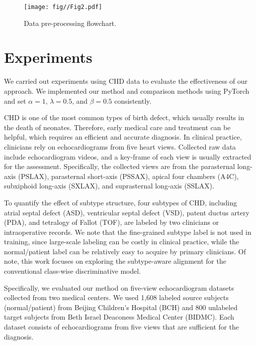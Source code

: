 

\begin{figure}[t]
\begin{center}
\texttt{[image: fig//Fig2.pdf]}
\end{center} 
\caption{Data pre-processing flowchart.}
\label{fig:2}
\end{figure}

\section{Experiments}

We carried out experiments using CHD data to evaluate the effectiveness of our approach. We implemented our method and comparison methods using PyTorch and set $\alpha=1$, $\lambda=0.5$, and $\beta=0.5$ consistently.

CHD is one of the most common types of birth defect, which usually results in the death of neonates. Therefore, early medical care and treatment can be helpful, which requires an efficient and accurate diagnosis. In clinical practice, clinicians rely on echocardiograms from five heart views. Collected raw data include echocardiogram videos, and a key-frame of each view is usually extracted for the assessment. Specifically, the collected views are from the parasternal long-axis (PSLAX), parasternal short-axis (PSSAX), apical four chambers (A4C), subxiphoid long-axis (SXLAX), and suprasternal long-axis (SSLAX). 

To quantify the effect of subtype structure, four subtypes of CHD, including atrial septal defect (ASD), ventricular septal defect (VSD), patent ductus artery (PDA), and tetralogy of Fallot (TOF), are labeled by two clinicians or intraoperative records. We note that the fine-grained subtype label is not used in training, since large-scale labeling can be costly in clinical practice, while the normal/patient label can be relatively easy to acquire by primary clinicians. Of note, this work focuses on exploring the subtype-aware alignment for the conventional class-wise discriminative model.

Specifically, we evaluated our method on five-view echocardiogram datasets collected from two medical centers. We used 1,608 labeled source subjects (normal/patient) from Beijing Children's Hospital (BCH) and 800 unlabeled target subjects from Beth Israel Deaconess Medical Center (BIDMC). Each dataset consists of echocardiograms from five views that are sufficient for the diagnosis. 

